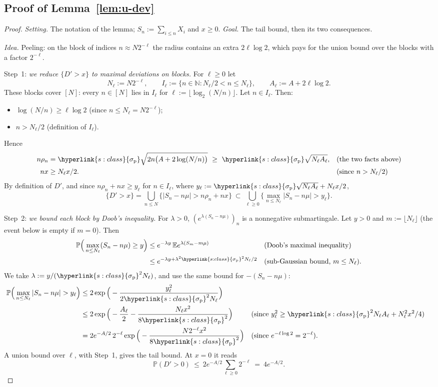 \documentclass[11pt]{article}
\DeclareRobustCommand{\sy}[2]{{\hyperlink{#1}{#2}}}
\newcommand{\Nat}{\mathbb{N}}
\newcommand{\E}{\mathbb{E}}
\renewcommand{\P}{\mathbb{P}}
\newcommand{\1}{\mathbf{1}}
\newcommand{\sigp}{\sy{s:class}{\sigma_{\mathrm p}}}
\begin{document}
\subsection{Proof of Lemma~\ref{lem:u-dev}}
\begin{proof}
\textit{Setting.} The notation of the lemma; $S_n:=\sum_{i\le n}X_i$ and $x\ge0$. \textit{Goal.} The tail bound, then its two consequences.

\textit{Idea.} Peeling: on the block of indices $n\approx N2^{-\ell}$ the radius contains an extra $2\ell\log2$, which pays for the union bound over the blocks
with a factor $2^{-\ell}$.

Step~1: \emph{we reduce $\{D'>x\}$ to maximal deviations on blocks.} For $\ell\ge0$ let
\[
N_\ell:=N2^{-\ell},\qquad I_\ell:=\{n\in\Nat:N_\ell/2<n\le N_\ell\},\qquad A_\ell:=A+2\ell\log2 .
\]
These blocks cover $[N]$: every $n\in[N]$ lies in $I_\ell$ for $\ell:=\lfloor\log_2(N/n)\rfloor$. Let $n\in I_\ell$. Then:
\begin{itemize}
\item $\log(N/n)\ge\ell\log2$ (since $n\le N_\ell=N2^{-\ell}$);
\item $n>N_\ell/2$ (definition of $I_\ell$).
\end{itemize}
Hence
\begin{align*}
n\rho_n&=\sigp\sqrt{2n\big(A+2\log(N/n)\big)}\ \ge\ \sigp\sqrt{N_\ell A_\ell}, &&\text{(the two facts above)}\\
nx&\ge N_\ell x/2 . &&\text{(since $n>N_\ell/2$)}
\end{align*}
By definition of $D'$, and since $n\rho_n+nx\ge y_\ell$ for $n\in I_\ell$, where $y_\ell:=\sigp\sqrt{N_\ell A_\ell}+N_\ell x/2$,
\[
\{D'>x\}=\bigcup_{n\le N}\big\{|S_n-n\mu|>n\rho_n+nx\big\}\ \subset\ \bigcup_{\ell\ge0}\Big\{\max_{n\le N_\ell}|S_n-n\mu|>y_\ell\Big\}.
\]

Step~2: \emph{we bound each block by Doob's inequality.} For $\lambda>0$, $(e^{\lambda(S_n-n\mu)})_n$ is a nonnegative submartingale. Let $y>0$ and
$m:=\lfloor N_\ell\rfloor$ (the event below is empty if $m=0$). Then
\begin{align*}
\P\Big(\max_{n\le N_\ell}(S_n-n\mu)\ge y\Big)&\le e^{-\lambda y}\,\E e^{\lambda(S_m-m\mu)} &&\text{(Doob's maximal inequality)}\\
&\le e^{-\lambda y+\lambda^2\sigp^2N_\ell/2} &&\text{(sub-Gaussian bound, $m\le N_\ell$)}.
\end{align*}
We take $\lambda:=y/(\sigp^2N_\ell)$, and use the same bound for $-(S_n-n\mu)$:
\begin{align*}
\P\Big(\max_{n\le N_\ell}|S_n-n\mu|>y_\ell\Big)&\le2\exp\Big(-\frac{y_\ell^2}{2\sigp^2N_\ell}\Big)\\
&\le2\exp\Big(-\frac{A_\ell}2-\frac{N_\ell x^2}{8\sigp^2}\Big) &&\text{(since $y_\ell^2\ge\sigp^2N_\ell A_\ell+N_\ell^2x^2/4$)}\\
&=2e^{-A/2}\,2^{-\ell}\exp\Big(-\frac{N2^{-\ell}x^2}{8\sigp^2}\Big) &&\text{(since $e^{-\ell\log2}=2^{-\ell}$)}.
\end{align*}
A union bound over $\ell$, with Step~1, gives the tail bound. At $x=0$ it reads
\[
\P(D'>0)\ \le\ 2e^{-A/2}\sum_{\ell\ge0}2^{-\ell}\ =\ 4e^{-A/2}.
\]


\end{proof}
\end{document}
